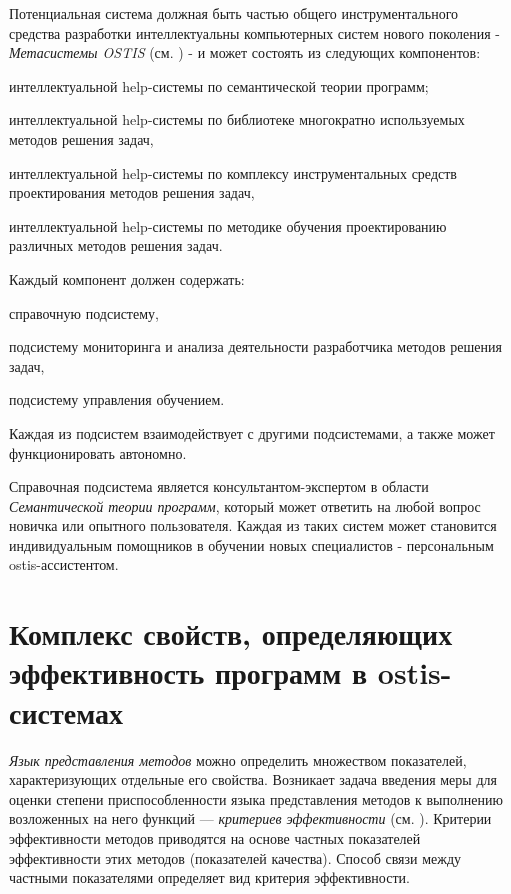 Потенциальная система должная быть частью общего инструментального средства разработки интеллектуальны компьютерных систем нового поколения - \textit{Метасистемы OSTIS} (см. ) - и может состоять из следующих компонентов:
\begin{textitemize}
	\item интеллектуальной help-системы по семантической теории программ;
	\item интеллектуальной help-системы по библиотеке многократно используемых методов решения задач,
	\item интеллектуальной help-системы по комплексу инструментальных средств проектирования  методов решения задач,
	\item интеллектуальной help-системы по методике обучения проектированию различных методов решения задач.
\end{textitemize}

Каждый компонент должен содержать:
\begin{textitemize}
	\item справочную подсистему,
	\item подсистему мониторинга и анализа деятельности разработчика методов решения задач,
	\item подсистему управления обучением.
\end{textitemize}

Каждая из подсистем взаимодействует с другими подсистемами, а также может функционировать автономно.

Справочная подсистема является консультантом-экспертом в области \textit{Семантической теории программ}, который может ответить на любой вопрос новичка или опытного пользователя. Каждая из таких систем может становится индивидуальным помощников в обучении новых специалистов - персональным ostis-ассистентом.

\section{Комплекс свойств, определяющих эффективность программ в ostis-системах}
\label{sec_programs_method_kriteria}

\textit{Язык представления методов} можно определить множеством показателей, характеризующих отдельные его свойства. Возникает задача введения меры для оценки степени приспособленности языка представления методов к выполнению возложенных на него функций — \textit{критериев эффективности} (см. ). Критерии эффективности методов приводятся на основе частных показателей эффективности этих методов (показателей качества). Способ связи между частными показателями определяет вид критерия эффективности.

